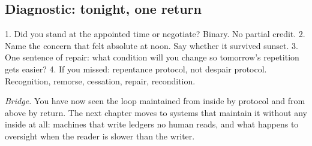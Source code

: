 \subsection*{Diagnostic: tonight, one return}

1. Did you stand at the appointed time or negotiate? Binary. No partial credit.
2. Name the concern that felt absolute at noon. Say whether it survived sunset.
3. One sentence of repair: what condition will you change so tomorrow's repetition gets easier?
4. If you missed: repentance protocol, not despair protocol. Recognition, remorse, cessation, repair, recondition.

\textit{Bridge.} You have now seen the loop maintained from inside by protocol and from above by return. The next chapter moves to systems that maintain it without any inside at all: machines that write ledgers no human reads, and what happens to oversight when the reader is slower than the writer.
